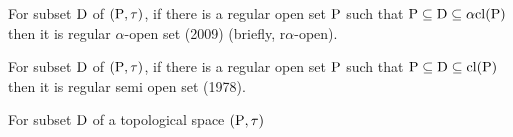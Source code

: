 \begin{dfn}\label{dfn1.2.6}
For subset $\mathrm{D}$ of $(\mathrm{P}, \tau)$, if there is a regular open set $\mathrm{P}$ such that $\mathrm{P} \subseteq \mathrm{D} \subseteq \alpha \mathrm{cl}(\mathrm{P})$ then it is regular $\alpha$-open set (2009) (briefly, r$\alpha$-open).
\end{dfn}

\begin{dfn}\label{dfn1.2.7}
For subset $\mathrm{D}$ of $(\mathrm{P}, \tau)$, if there is a regular open set $\mathrm{P}$ such that $\mathrm{P} \subseteq \mathrm{D} \subseteq \mathrm{cl}(\mathrm{P})$ then it is regular semi open set (1978). 
\end{dfn}

\begin{dfn}\label{dfn1.2.8}
For subset $\mathrm{D}$ of a topological space $(\mathrm{P}, \tau)$ 
\end{dfn}

